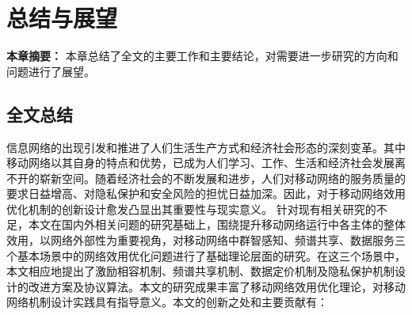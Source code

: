 \chapter{总结与展望}
\textbf{本章摘要：} 本章总结了全文的主要工作和主要结论，对需要进一步研究的方向和问题进行了展望。

\section{全文总结}


信息网络的出现引发和推进了人们生活生产方式和经济社会形态的深刻变革。其中移动网络以其自身的特点和优势，已成为人们学习、工作、生活和经济社会发展离不开的崭新空间。随着经济社会的不断发展和进步，人们对移动网络的服务质量的要求日益增高、对隐私保护和安全风险的担忧日益加深。因此，对于移动网络效用优化机制的创新设计愈发凸显出其重要性与现实意义。
针对现有相关研究的不足，本文在国内外相关问题的研究基础上，围绕提升移动网络运行中各主体的整体效用，以网络外部性为重要视角，对移动网络中群智感知、频谱共享、数据服务三个基本场景中的网络效用优化问题进行了基础理论层面的研究。在这三个场景中，本文相应地提出了激励相容机制、频谱共享机制、数据定价机制及隐私保护机制设计的改进方案及协议算法。本文的研究成果丰富了移动网络效用优化理论，对移动网络机制设计实践具有指导意义。本文的创新之处和主要贡献有：

